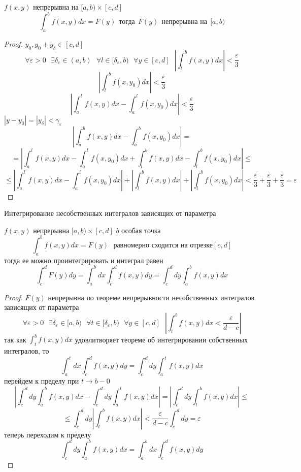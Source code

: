 \begin{theorem}
  $f(x,y)$ непрерывна на $[a,b) \times [c, d]$
  $$
  \int_a^b f(x,y) dx = F(y) ~~ \text{тогда} ~~ F(y) ~~ \text{непрерывна на} ~~
  [a,b)
  $$
\end{theorem}

\begin{proof}
  $y_0, y_0 + y_{\delta} \in [c, d]$
  $$
  \forall \varepsilon > 0
  ~~~
  \exists \delta_{\varepsilon} \in (a,b)
  ~~~
  \forall l \in [\delta_{\varepsilon}, b)
  ~~~
  \forall y \in [c, d]
  ~~~
  \left|
    \int_l^b f(x,y)dx
  \right|
  < \frac{\varepsilon}{3}
  $$
  $$
  \left|
    \int_l^b f(x,y_0)dx
  \right|
  < \frac{\varepsilon}{3}
  $$
  $$
  \left|
    \int_a^l f(x,y)dx
    -
    \int_a^l f(x,y_0)dx
  \right|
  < \frac{\varepsilon}{3}
  $$
  $|y - y_0| = |y_{\delta}| < \gamma_{\varepsilon}$
  $$
  \left|
    \int_a^b f(x,y)dx
    -
    \int_a^b f(x,y_0)dx
  \right|
  =
  $$
  $$
  =
  \left|
    \int_a^l f(x,y)dx
    -
    \int_a^l f(x,y_0)dx
    +
    \int_l^b f(x,y)dx
    -
    \int_l^b f(x,y_0)dx
  \right|
  \le
  $$
  $$
  \le
  \left|
    \int_a^l f(x,y)dx
    -
    \int_a^l f(x,y_0)dx
  \right|
  +
  \left|
    \int_l^b f(x,y)dx
  \right|
  +
  \left|
    \int_l^b f(x,y_0)dx
  \right|
  <
    \frac{\varepsilon}{3}
    +
    \frac{\varepsilon}{3}
    +
    \frac{\varepsilon}{3}
  =
    \varepsilon
  $$
\end{proof}

\begin{title}[\Large]
  Интегрирование несобственных интегралов зависящих от параметра
\end{title}

\begin{theorem}
  $f(x,y)$ непрерывна $[a,b) \times [c,d]$ $b$ особая точка
  $$
  \int_a^b f(x,y) dx = F(y) ~~~ \text{равномерно сходится на отрезке} [c,d]
  $$
  тогда ее можно проинтегрировать и интеграл равен
  $$
  \int_c^d F(y) dy = \int_a^b dx \int_c^d f(x,y) dy =
  \int_c^d dy \int_a^b f(x,y) dx
  $$
\end{theorem}

\begin{proof}
  $F(y)$ непрерывна по теореме непрерывности несобственных интегралов зависящих
  от параметра
  $$
  \forall \varepsilon > 0
  ~~~
  \exists \delta_{\varepsilon} \in [a, b)
  ~~~
  \forall t \in [\delta_{\varepsilon}, b)
  ~~~
  \forall y \in [c,d]
  ~~~
  \left|
    \int_t^b f(x,y) dx < \frac{\varepsilon}{d-c}
  \right|
  $$
  так как $\int_t^b f(x,y) dx$ удовлитворяет теореме об интегрировании
  собственных интегралов, то
  $$
  \int_a^t dx \int_c^d f(x,y) dy =
  \int_c^d dy \int_a^t f(x,y) dx
  $$
  перейдем к пределу при $t \to b -0$
  $$
  \left|
    \int_c^d dy \int_a^b f(x,y) dx
    -
    \int_c^d dy \int_a^t f(x,y) dx
  \right|
  =
  \left|
    \int_c^d dy \int_t^b f(x,y) dx
  \right|
  \le
  $$
  $$
  \le
  \int_c^d dy
  \left|
    \int_t^b f(x,y) dx
  \right|
  <
  \frac{\varepsilon}{d-c} \int_c^d dy = \varepsilon
  $$
  теперь переходим к пределу
  $$
  \int_c^d dy \int_a^b f(x,y) dx
  =
  \int_a^b dx \int_c^d f(x,y) dy
  $$
\end{proof}

